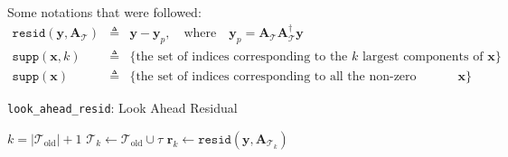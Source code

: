 \documentclass[12pt]{article}
\begin{document}
	Some notations that were followed:
\begin{eqnarray*}
\texttt{resid}(\boldsymbol{y}, \boldsymbol{A}_{\mathcal{T}}) &\triangleq& \boldsymbol{y} - \boldsymbol{y}_p, \quad \text{where} \quad \boldsymbol{y}_p = \boldsymbol{A}_\mathcal{T}\boldsymbol{A}_\mathcal{T}^\dagger\boldsymbol{y}\\
\texttt{supp}(\boldsymbol{x}, k) &\triangleq& \text{\{the set of indices corresponding to the $k$ largest components of $\boldsymbol{x}$\}}\\
\texttt{supp}(\boldsymbol{x}) &\triangleq& \text{\{the set of indices corresponding to all the non-zero components of $\boldsymbol{x}$\}}
\end{eqnarray*}
	\begin{algorithm}[ht]
		\caption{\texttt{look\_ahead\_resid}: Look Ahead Residual}
		\KwInit{}
		$k = |\mathcal{T}_{\text{old}}| + 1$\;
		$\mathcal{T}_k \gets \mathcal{T}_{\text{old}} \cup \tau$\;
		$\mathbf{r}_k \gets \texttt{resid}(\mathbf{y}, \mathbf{A}_{\mathcal{T}_k})$\;
		\KwIter{}
\end{algorithm}
\end{document}
